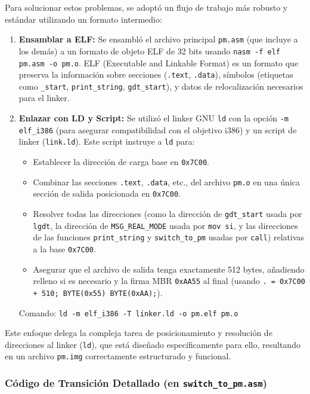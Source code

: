 Para solucionar estos problemas, se adoptó un flujo de trabajo más robusto y estándar utilizando un formato intermedio:
\begin{enumerate}
    \item \textbf{Ensamblar a ELF:} Se ensambló el archivo principal \texttt{pm.asm} (que incluye a los demás) a un formato de objeto ELF de 32 bits usando \texttt{nasm -f elf pm.asm -o pm.o}. ELF (Executable and Linkable Format) es un formato que preserva la información sobre secciones (\texttt{.text}, \texttt{.data}), símbolos (etiquetas como \texttt{\_start}, \texttt{print\_string}, \texttt{gdt\_start}), y datos de relocalización necesarios para el linker.
    \item \textbf{Enlazar con LD y Script:} Se utilizó el linker GNU \texttt{ld} con la opción \texttt{-m elf\_i386} (para asegurar compatibilidad con el objetivo i386) y un script de linker (\texttt{link.ld}). Este script instruye a \texttt{ld} para:
        \begin{itemize}
            \item Establecer la dirección de carga base en \texttt{0x7C00}.
            \item Combinar las secciones \texttt{.text}, \texttt{.data}, etc., del archivo \texttt{pm.o} en una única sección de salida posicionada en \texttt{0x7C00}.
            \item Resolver todas las direcciones (como la dirección de \texttt{gdt\_start} usada por \texttt{lgdt}, la dirección de \texttt{MSG\_REAL\_MODE} usada por \texttt{mov si}, y las direcciones de las funciones \texttt{print\_string} y \texttt{switch\_to\_pm} usadas por \texttt{call}) relativas a la base \texttt{0x7C00}.
            \item Asegurar que el archivo de salida tenga exactamente 512 bytes, añadiendo relleno si es necesario y la firma MBR \texttt{0xAA55} al final (usando \texttt{. = 0x7C00 + 510; BYTE(0x55) BYTE(0xAA);}).
        \end{itemize}
        Comando: \texttt{ld -m elf\_i386 -T linker.ld -o pm.elf pm.o}
\end{enumerate}
Este enfoque delega la compleja tarea de posicionamiento y resolución de direcciones al linker (\texttt{ld}), que está diseñado específicamente para ello, resultando en un archivo \texttt{pm.img} correctamente estructurado y funcional.

\subsubsection{Código de Transición Detallado (en \texttt{switch\_to\_pm.asm})}

